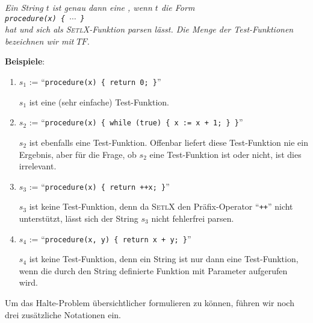 \begin{Definition} 
{\em Ein String $t$ ist genau dann eine , wenn $t$ 
 die Form \\[0.3cm]
\hspace*{1.3cm} {\tt procedure(x) \{ $\cdots$ \}} \\[0.3cm]
hat und sich als \textsc{SetlX}-Funktion parsen lässt.  Die Menge der
Test-Funktionen bezeichnen wir mit $T\!F$.}  \eox
\end{Definition}

\noindent
\textbf{Beispiele}:  
\begin{enumerate}
\item $s_1$ := ``{\tt procedure(x) \{ return 0; \}}''

      $s_1$ ist eine (sehr einfache) Test-Funktion.
\item $s_2$ := ``{\tt procedure(x) \{ while (true) \{ x := x + 1; \} \}}''

      $s_2$ ist ebenfalls eine Test-Funktion.  Offenbar liefert diese Test-Funktion nie ein
      Ergebnis, aber für die Frage, ob $s_2$ eine Test-Funktion ist oder nicht, ist dies
      irrelevant.
\item $s_3$ := ``{\tt procedure(x) \{ return ++x; \}}''

      $s_3$ ist keine Test-Funktion, denn da \textsc{SetlX} den Präfix-Operator
      ``\texttt{++}'' nicht unterstützt, lässt sich der String $s_3$  nicht fehlerfrei parsen.
\item $s_4$ := ``{\tt procedure(x, y) \{ return x + y; \}}''

      $s_4$ ist keine Test-Funktion, denn ein String ist nur dann eine Test-Funktion, wenn die durch den String
      definierte Funktion mit  Parameter aufgerufen wird.
\end{enumerate}
Um das Halte-Problem übersichtlicher formulieren zu können, führen wir noch drei
zusätzliche Notationen ein.
